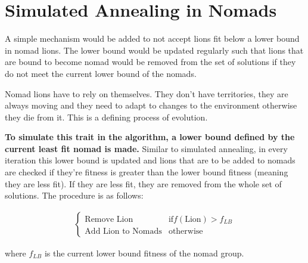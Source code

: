 \section{Simulated Annealing in Nomads}
\par A simple mechanism would be added to not accept lions fit below a lower bound in nomad lions. The lower bound would be updated regularly such that lions that are bound to become nomad would be removed from the set of solutions if they do not meet the current lower bound of the nomads.

\par Nomad lions have to rely on themselves. They don't have territories, they are always moving and they need to adapt to changes to the environment otherwise they die from it. This is a defining process of evolution. \cite{evo}

\par \textbf{To simulate this trait in the algorithm, a lower bound defined by the current least fit nomad is made.} Similar to simulated annealing, in every iteration this lower bound is updated and lions that are to be added to nomads are checked if they're fitness is greater than the lower bound fitness (meaning they are less fit). \cite{sa} If they are less fit, they are removed from the whole set of solutions. The procedure is as follows:

\begin{align*}
\begin{cases}
   \text{Remove Lion}        & \text{if} f(\text{Lion})  > f_{LB} \\
   \text{Add Lion to Nomads}        & \text{otherwise}
\end{cases}
\end{align*}

where $f_{LB}$ is the current lower bound fitness of the nomad group.
